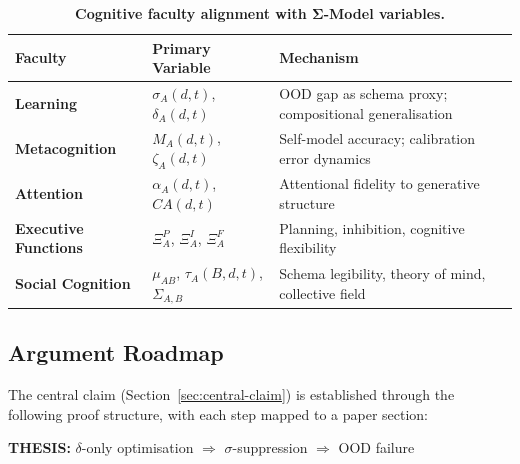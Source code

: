 \documentclass[11pt,a4paper]{article}
\begin{document}
\begin{table}[htbp]
\centering
\caption{\textbf{Cognitive faculty alignment with Σ-Model variables.}}
\label{tab:faculty-alignment}
\begin{tabular}{>{\raggedright}p{3.2cm} >{\raggedright}p{3.5cm} >{\raggedright\arraybackslash}p{7cm}}
\toprule
\textbf{Faculty} & \textbf{Primary Variable} & \textbf{Mechanism} \\
\midrule
\textbf{Learning} & $\sigma_A(d,t)$, $\delta_A(d,t)$ & OOD gap as schema proxy; compositional generalisation \\
\textbf{Metacognition} & $\hat{M}_A(d,t)$, $\zeta_A(d,t)$ & Self-model accuracy; calibration error dynamics \\
\textbf{Attention} & $\alpha_A(d,t)$, $CA(d,t)$ & Attentional fidelity to generative structure \\
\textbf{Executive Functions} & $\Xi_A^P$, $\Xi_A^I$, $\Xi_A^F$ & Planning, inhibition, cognitive flexibility \\
\textbf{Social Cognition} & $\mu_{AB}$, $\tau_A(B,d,t)$, $\Sigma_{A,B}$ & Schema legibility, theory of mind, collective field \\
\bottomrule
\end{tabular}
\end{table}

\subsection{Argument Roadmap}\label{sec:argument-roadmap}

The central claim (Section~\ref{sec:central-claim}) is established through the
following proof structure, with each step mapped to a paper section:

\textbf{THESIS:} $\delta$-only optimisation $\Rightarrow$ $\sigma$-suppression $\Rightarrow$ OOD failure
\end{document}
